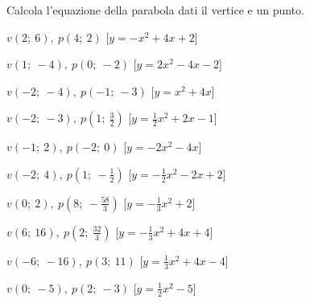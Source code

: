 \begin{esercizio}\label{ese:}
 Calcola l'equazione della parabola dati il vertice e un punto.
 \begin{enumeratea}
  \item  \(v \left (2;~6 \right ),~p \left (4;~2 \right )\)
   \hfill [\(y=- x^2 +4 x +2\)]
  \item  \(v \left (1;~-4 \right ),~p \left (0;~-2 \right )\)
   \hfill [\(y=2 x^2 -4 x -2\)]
  \item  \(v \left (-2;~-4 \right ),~p \left (-1;~-3 \right )\)
   \hfill [\(y=x^2 +4 x \)]
  \item  \(v \left (-2;~-3 \right ),~p \left (1;~\frac{3}{2} \right )\)
   \hfill [\(y=\frac{1}{2} x^2 +2 x -1\)]
  \item  \(v \left (-1;~2 \right ),~p \left (-2;~0 \right )\)
   \hfill [\(y=-2 x^2 -4 x \)]
  \item  \(v \left (-2;~4 \right ),~p \left (1;~-\frac{1}{2} \right )\)
   \hfill [\(y=-\frac{1}{2} x^2 -2 x +2\)]
  \item  \(v \left (0;~2 \right ),~p \left (8;~-\frac{58}{3} \right )\)
   \hfill [\(y=-\frac{1}{3} x^2 +2\)]
  \item  \(v \left (6;~16 \right ),~p \left (2;~\frac{32}{3} \right )\)
   \hfill [\(y=-\frac{1}{3} x^2 +4 x +4\)]
  \item  \(v \left (-6;~-16 \right ),~p \left (3;~11 \right )\)
   \hfill [\(y=\frac{1}{3} x^2 +4 x -4\)]
  \item  \(v \left (0;~-5 \right ),~p \left (2;~-3 \right )\)
   \hfill [\(y=\frac{1}{2} x^2 -5\)]
 \end{enumeratea}
\end{esercizio}

